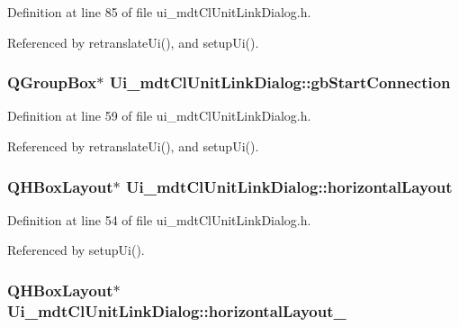 Definition at line 85 of file ui\-\_\-mdt\-Cl\-Unit\-Link\-Dialog.\-h.



Referenced by retranslate\-Ui(), and setup\-Ui().

\hypertarget{class_ui__mdt_cl_unit_link_dialog_a228dc3f2c9fc5406ce6dbb015c72bb72}{
\subsubsection[{gb\-Start\-Connection}]{\setlength{\rightskip}{0pt plus 5cm}Q\-Group\-Box$\ast$ Ui\-\_\-mdt\-Cl\-Unit\-Link\-Dialog\-::gb\-Start\-Connection}}\label{class_ui__mdt_cl_unit_link_dialog_a228dc3f2c9fc5406ce6dbb015c72bb72}


Definition at line 59 of file ui\-\_\-mdt\-Cl\-Unit\-Link\-Dialog.\-h.



Referenced by retranslate\-Ui(), and setup\-Ui().

\hypertarget{class_ui__mdt_cl_unit_link_dialog_a36aaec1c29ec158309c200a47d2eb548}{
\subsubsection[{horizontal\-Layout}]{\setlength{\rightskip}{0pt plus 5cm}Q\-H\-Box\-Layout$\ast$ Ui\-\_\-mdt\-Cl\-Unit\-Link\-Dialog\-::horizontal\-Layout}}\label{class_ui__mdt_cl_unit_link_dialog_a36aaec1c29ec158309c200a47d2eb548}


Definition at line 54 of file ui\-\_\-mdt\-Cl\-Unit\-Link\-Dialog.\-h.



Referenced by setup\-Ui().

\hypertarget{class_ui__mdt_cl_unit_link_dialog_ad0092bded4ca58a8fee1778885d8f851}{
\subsubsection[{horizontal\-Layout\-\_\-10}]{\setlength{\rightskip}{0pt plus 5cm}Q\-H\-Box\-Layout$\ast$ Ui\-\_\-mdt\-Cl\-Unit\-Link\-Dialog\-::horizontal\-Layout\-\_}}\label{class_ui__mdt_cl_unit_link_dialog_ad0092bded4ca58a8fee1778885d8f851}


